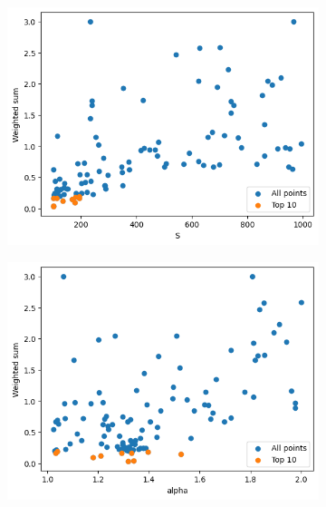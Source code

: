 \begin{frame}
\begin{figure}

        \hfill
        \begin{subfigure}{0.45\textwidth}
            \includegraphics[width=\textwidth]{../images/report/w123-S.png}
        \end{subfigure}
        \hfill
        \begin{subfigure}{0.45\textwidth}
            \includegraphics[width=\textwidth]{../images/report/w123-alpha.png}
        \end{subfigure}
        \hfill
    \end{figure}
\end{frame}


